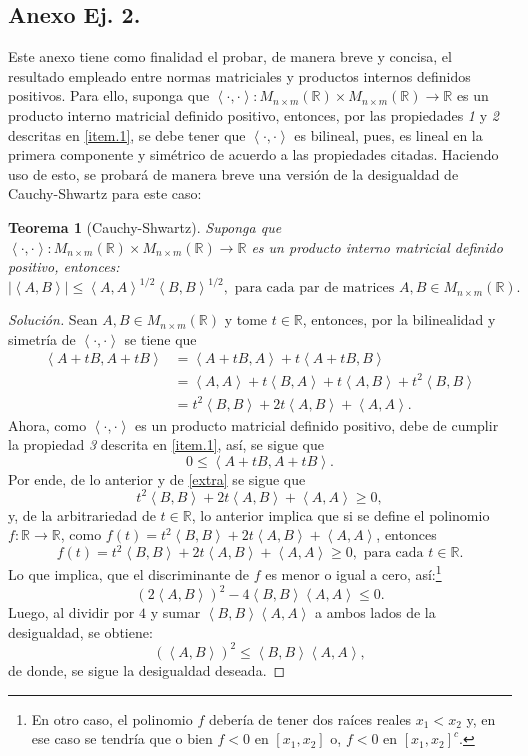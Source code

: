 \documentclass[10.5pt,notitlepage]{article}
\newenvironment{solucion}
  {\begin{proof}[Solución]}
  {\end{proof}}
\newcommand{\RR}{\mathbb{R}}
\newcommand{\abs}[1]{\left\lvert #1 \right\rvert}
\newcommand{\inner}[1]{\left\langle #1 \right\rangle}
\theoremstyle{plain}
\newtheorem{thm}{Teorema}[section] %
\begin{document}
\subsection{Anexo Ej. 2.}\label{anex}
Este anexo tiene como finalidad el probar, de manera breve y concisa, el resultado empleado entre normas matriciales y productos internos definidos positivos. Para ello, suponga que \(\inner{\cdot, \cdot}:M_{n\times m}(\RR)\times M_{n\times m}(\RR)\to \RR\) es un producto interno matricial definido positivo, entonces, por las propiedades \textit{1} y \textit{2} descritas en \ref{item.1}, se debe tener que \(\inner{\cdot, \cdot}\) es bilineal, pues, es lineal en la primera componente y simétrico de acuerdo a las propiedades citadas. Haciendo uso de esto, se probará de manera breve una versión de la desigualdad de Cauchy-Shwartz para este caso:
\begin{thm}[Cauchy-Shwartz]\label{thm.1}
Suponga que \(\inner{\cdot, \cdot}:M_{n\times m}(\RR)\times M_{n\times m}(\RR)\to \RR\) es un producto interno matricial definido positivo, entonces:
\begin{equation*}
    \abs{\inner{A,B}} \leq \inner{A,A}^{1/2}\inner{B,B}^{1/2}, \text{ para cada par de matrices } A,B \in M_{n \times m}(\RR). 
\end{equation*}
\end{thm}
\begin{solucion}
Sean \(A,B \in M_{n \times m}(\RR)\) y tome \(t \in \RR\), entonces, por la bilinealidad y simetría de \(\inner{\cdot, \cdot}\) se tiene que 
\begin{align}\label{extra}
     \inner{A + tB, A + tB} &=    \inner{A + tB, A} +  t\inner{A + tB, B} \nonumber\\ 
                            &= \inner{A,A} +  t\inner{B,A} +  t\inner{A,B} + t^2\inner{B,B}\nonumber\\
                            &=  t^2\inner{B,B} + 2t\inner{A,B} + \inner{A,A}.
\end{align}
Ahora, como \(\inner{\cdot, \cdot}\) es un producto matricial definido positivo, debe de cumplir la propiedad \textit{3} descrita en \ref{item.1}, así, se sigue que
\[
 0 \leq \inner{A + tB, A + tB}.
\]
Por ende, de lo anterior y de \eqref{extra} se sigue que
\[
 t^2\inner{B,B} + 2t\inner{A,B} + \inner{A,A} \geq 0,
\]
y, de la arbitrariedad de \(t \in \RR\), lo anterior implica que si se define el polinomio \(f:\RR \to \RR\), como \(f(t) = t^2\inner{B,B} + 2t\inner{A,B} + \inner{A,A}\), entonces 
\[
f(t) = t^2\inner{B,B} + 2t\inner{A,B} + \inner{A,A} \geq 0, \text{ para cada } t\in \RR.
\]
Lo que implica, que el discriminante de \(f\) es menor o igual a cero, así:\footnote{En otro caso, el polinomio \(f\) debería de tener dos raíces reales \(x_1 < x_2\) y, en ese caso se tendría que o bien \(f < 0\) en \([x_1,x_2]\) o, \(f < 0\) en \([x_1,x_2]^c\).}
\[
(2\inner{A,B})^2 - 4\inner{B,B}\inner{A,A} \leq 0.
\]
Luego, al dividir por \(4\) y sumar \(\inner{B,B}\inner{A,A}\) a ambos lados de la desigualdad, se obtiene:
\[
(\inner{A,B})^2 \leq \inner{B,B}\inner{A,A},
\]
de donde, se sigue la desigualdad deseada.
\end{solucion}
\end{document}
